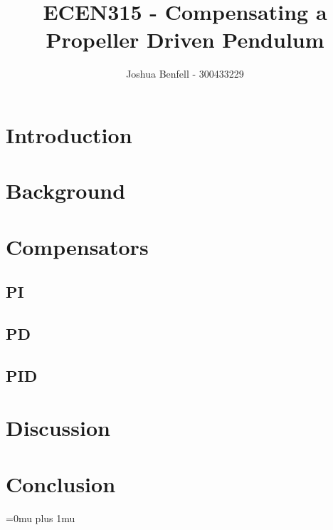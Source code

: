 \documentclass[a4paper, 11pt, compsoc]{IEEEtran}
\title{ECEN315 - Compensating a Propeller Driven Pendulum }
\author{Joshua Benfell - 300433229}
\begin{document}
    \maketitle
    \IEEEdisplaynontitleabstractindextext

    \section{Introduction}\label{sec:intro}
    \section{Background}\label{sec:bg}
    \section{Compensators}\label{sec:comp}
        \subsection{PI}\label{sec:pi}
        \subsection{PD}\label{sec:pd}
        \subsection{PID}\label{sec:pid}
    \section{Discussion}\label{sec:disc}
    \section{Conclusion}\label{sec:conc}

    \Urlmuskip=0mu plus 1mu\relax
    
    

    \onecolumn
    \appendices
\end{document}
